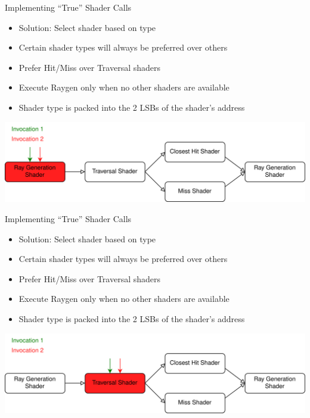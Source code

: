 \documentclass[aspectratio=169,t]{beamer}
\begin{document}
\begin{slide}{Implementing ``True'' Shader Calls}
 \begin{itemize}
  \item Solution: Select shader based on type
  \item Certain shader types will always be preferred over others
  \item Prefer Hit/Miss over Traversal shaders
  \item Execute Raygen only when no other shaders are available
  \item Shader type is packed into the 2 LSBs of the shader's address
 \end{itemize}
 \includegraphics[width=\textwidth]{graphics/RTStages2-1.png}
\end{slide}

\begin{slide}{Implementing ``True'' Shader Calls}
 \begin{itemize}
  \item Solution: Select shader based on type
  \item Certain shader types will always be preferred over others
  \item Prefer Hit/Miss over Traversal shaders
  \item Execute Raygen only when no other shaders are available
  \item Shader type is packed into the 2 LSBs of the shader's address
 \end{itemize}
 \includegraphics[width=\textwidth]{graphics/RTStages2-2.png}
\end{slide}
\end{document}
